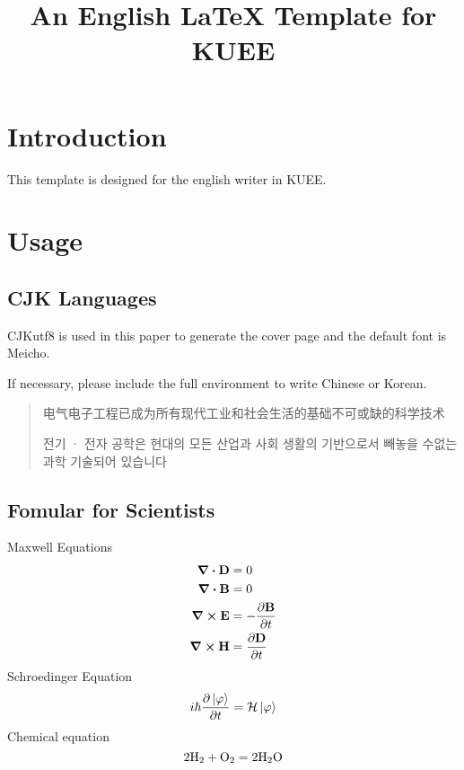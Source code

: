 \documentclass[final]{kuee_en}
\title{An English \LaTeX{} Template for KUEE}
\author{\cjk{電気　次郎}} %
\date{\cjk{令和2年2月1日}}
\begin{document}
\maketitle

\begin{abstract}
    \lipsum[1]
\end{abstract}

\tableofcontents

\chapter{Introduction}
This template is designed for the english writer in KUEE.

\lipsum[3-7]

\chapter{Usage}

\section{CJK Languages}

CJKutf8 is used in this paper to generate the cover page and the default font is Meicho.
\begin{quote}
\end{quote}
If necessary, please include the full environment to write Chinese or Korean.

\begin{quote}
    \begin{CJK}{UTF8}{gbsn}
    电气电子工程已成为所有现代工业和社会生活的基础不可或缺的科学技术
    \end{CJK}
    \newline
    \begin{CJK}{UTF8}{nanummj}
    전기 · 전자 공학은 현대의 모든 산업과 사회 생활의 기반으로서 빼놓을 수없는 과학 기술되어 있습니다
    \end{CJK} 
\end{quote}


\section{Fomular for Scientists}
Maxwell Equations
\begin{align*}
    \div{\vb{D}} &= 0 \\
    \div{\vb{B}} &= 0 \\
    \curl{\vb{E}} &= -\pdv{\vb{B}}{t} \\
    \curl{\vb{H}} &= \pdv{\vb{D}}{t}
\end{align*}
Schroedinger Equation
$$
    i\hbar \pdv{\ket{\varphi}}{t} = \mathcal{H} \ket{\varphi}
$$
Chemical equation
$$
    2\ce{H2}+\ce{O2} = 2\ce{H2O}
$$
\end{document}
